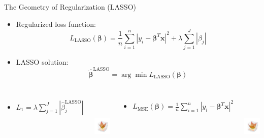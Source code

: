 \begin{frame}{The Geometry of Regularization (LASSO)}
    \begin{itemize}
        \item Regularized loss function:
        \[
            L_{\text{LASSO}}(\boldsymbol{\beta}) = \frac{1}{n} \sum_{i=1}^{n} \left| y_i - \boldsymbol{\beta}^T \mathbf{x} \right|^2 + \lambda \sum_{j=1}^{J} |\beta_j|
        \]
        \item LASSO solution:
        \[
            \hat{\boldsymbol{\beta}}^{\text{LASSO}} = \arg\min L_{\text{LASSO}}(\boldsymbol{\beta})
        \]
    \end{itemize}

    \vspace{1em}

    \begin{columns}
        \begin{itemize}
            \item $L_1 = \lambda \sum_{j=1}^{J} \left| \hat{\beta}_j^{\text{LASSO}} \right|$
        \end{itemize}
        \begin{center}
            \includegraphics[height=3.5cm]{images/linear-regression/linear-regression-24.png}
        \end{center}

        \begin{itemize}
            \item $L_{\text{MSE}}(\boldsymbol{\beta}) = \frac{1}{n} \sum_{i=1}^{n} \left| y_i - \boldsymbol{\beta}^T \mathbf{x} \right|^2$
        \end{itemize}
        \begin{center}
            \includegraphics[height=3.5cm]{images/linear-regression/linear-regression-25.png}
        \end{center}
    \end{columns}
\end{frame}


